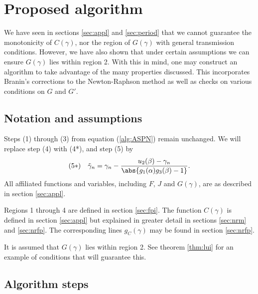 \documentclass{article}
\begin{document}
\section{Proposed algorithm}
\label{sec:algo}

We have seen in sections \ref{sec:appl} and \ref{sec:period} that we cannot guarantee the monotonicity of $C(\gamma)$, nor the region of $G(\gamma)$ with general transmission conditions.
However, we have also shown that under certain assumptions we can ensure $G(\gamma)$ lies within region 2.
With this in mind, one may construct an algorithm to take advantage of the many properties discussed.
This incorporates Branin's corrections to the Newton-Raphson method as well as checks on various conditions on $G$ and $G'$.

\subsection{Notation and assumptions}

Steps (1) through (3) from equation (\ref{alg:ASPN}) remain unchanged.
We will replace step (4) with (4*), and step (5) by
\begin{equation*}
(5*) \quad \tilde{\gamma}_n = \gamma_n - \frac{u_2(\beta) - \gamma_n}{\abs{g_1(\alpha) g_3(\beta) - 1}} .
\end{equation*}
All affiliated functions and variables, including $F$, $J$ and $G(\gamma)$, are as described in section \ref{sec:appl}.

Regions 1 through 4 are defined in section \ref{sec:fpi}.
The function $C(\gamma)$ is defined in section \ref{sec:appl} but explained in greater detail in sections \ref{sec:nrm} and \ref{sec:nrfp}.
The corresponding lines $g_C(\gamma)$ may be found in section \ref{sec:nrfp}.

It is assumed that $G(\gamma)$ lies within region 2.
See theorem \ref{thm:lui} for an example of conditions that will guarantee this.

\subsection{Algorithm steps}
\end{document}
